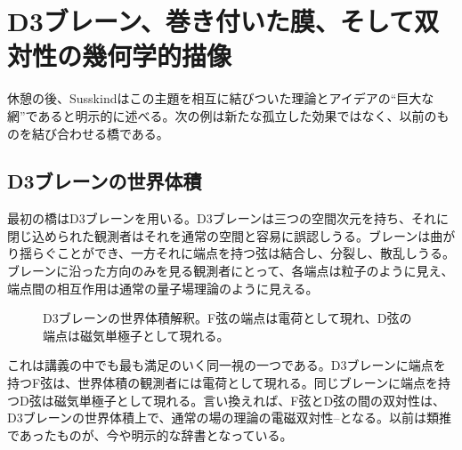 \section{D3ブレーン、巻き付いた膜、そして双対性の幾何学的描像}

休憩の後、Susskindはこの主題を相互に結びついた理論とアイデアの``巨大な網''であると明示的に述べる。次の例は新たな孤立した効果ではなく、以前のものを結び合わせる橋である。

\subsection{D3ブレーンの世界体積}

最初の橋はD3ブレーンを用いる。D3ブレーンは三つの空間次元を持ち、それに閉じ込められた観測者はそれを通常の空間と容易に誤認しうる。ブレーンは曲がり揺らぐことができ、一方それに端点を持つ弦は結合し、分裂し、散乱しうる。ブレーンに沿った方向のみを見る観測者にとって、各端点は粒子のように見え、端点間の相互作用は通常の量子場理論のように見える。

\begin{figure}[htbp]
\centering
{}%
\caption{D3ブレーンの世界体積解釈。F弦の端点は電荷として現れ、D弦の端点は磁気単極子として現れる。}
\end{figure}

これは講義の中でも最も満足のいく同一視の一つである。D3ブレーンに端点を持つF弦は、世界体積の観測者には電荷として現れる。同じブレーンに端点を持つD弦は磁気単極子として現れる。言い換えれば、F弦とD弦の間の双対性は、D3ブレーンの世界体積上で、通常の場の理論の電磁双対性--となる。以前は類推であったものが、今や明示的な辞書となっている。


